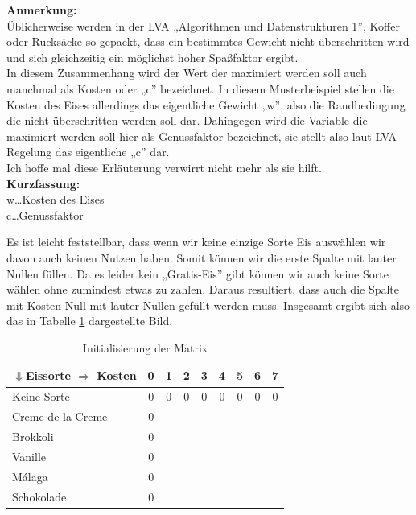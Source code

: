 \documentclass[a4paper, 12pt]{article}
\begin{document}
\begin{leftbar}
	\textbf{Anmerkung:}\\

	Üblicherweise werden in der LVA „Algorithmen und Datenstrukturen 1”, Koffer oder Rucksäcke so gepackt, dass ein bestimmtes Gewicht nicht überschritten wird und sich gleichzeitig ein möglichst hoher Spaßfaktor ergibt.\\

	In diesem Zusammenhang wird der Wert der maximiert werden soll auch manchmal als Kosten oder „c” bezeichnet. In diesem Musterbeispiel stellen die Kosten des Eises allerdings das eigentliche Gewicht „w”, also die Randbedingung die nicht überschritten werden soll dar. Dahingegen wird die Variable die maximiert werden soll hier als Genussfaktor bezeichnet, sie stellt also laut LVA-Regelung das eigentliche „c” dar.\\

	Ich hoffe mal diese Erläuterung verwirrt nicht mehr als sie hilft.\\

	\textbf{Kurzfassung:}\\
	w\dots Kosten des Eises\\
	c\dots Genussfaktor
\end{leftbar}

Es ist leicht feststellbar, dass wenn wir keine einzige Sorte Eis auswählen wir davon auch keinen Nutzen haben. Somit können wir die erste Spalte mit lauter Nullen füllen. Da es leider kein „Gratis-Eis” gibt können wir auch keine Sorte wählen ohne zumindest etwas zu zahlen. Daraus resultiert, dass auch die Spalte mit Kosten Null mit lauter Nullen gefüllt werden muss. Insgesamt ergibt sich also das in Tabelle \ref{table:Initialisierung} dargestellte Bild.

\begin{table}[H]
	\begin{center}
		\begin{tabular}{l|cccccccc}
			$\Downarrow$Eissorte $\Rightarrow$ Kosten & 0 & 1 & 2 & 3 & 4 & 5 &
			6 & 7\\
			\hline
			Keine Sorte			& 0 & 0 & 0 & 0 & 0 & 0 & 0 & 0 \\
			Creme de la Creme	& 0 &	&	&	&	&	&	&	\\
			Brokkoli			& 0 &	&	&	&	&	&	&	\\
			Vanille				& 0 &	&	&	&	&	&	&	\\
			Málaga				& 0 &	&	&	&	&	&	&	\\
			Schokolade			& 0 &	&	&	&	&	&	&	\\
		\end{tabular}
	\end{center}
\caption{Initialisierung der Matrix}
\label{table:Initialisierung}
\end{table}
\end{document}
